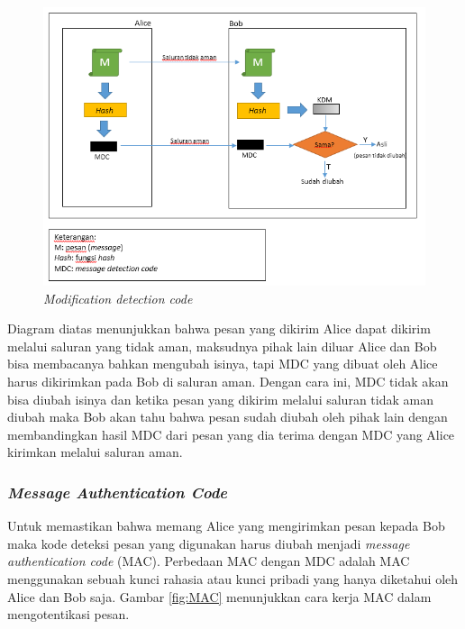 \begin{figure}[H]
	\includegraphics[scale=0.65]{Gambar/MDC}
	\centering
	\caption{\textit{Modification detection code}}\label{fig:MDC}
\end{figure}

Diagram diatas menunjukkan bahwa pesan yang dikirim Alice dapat dikirim melalui saluran yang tidak aman, maksudnya pihak lain diluar Alice dan Bob bisa membacanya bahkan mengubah isinya, tapi MDC yang dibuat oleh Alice harus dikirimkan pada Bob di saluran aman. Dengan cara ini, MDC tidak akan bisa diubah isinya dan ketika pesan yang dikirim melalui saluran tidak aman diubah maka Bob akan tahu bahwa pesan sudah diubah oleh pihak lain dengan membandingkan hasil MDC dari pesan yang dia terima dengan MDC yang Alice kirimkan melalui saluran aman.

\subsubsection{\textit{Message Authentication Code}}
Untuk memastikan bahwa memang Alice yang mengirimkan pesan kepada Bob maka kode deteksi pesan yang digunakan harus diubah menjadi \textit{message authentication code} (MAC). Perbedaan MAC dengan MDC adalah MAC menggunakan sebuah kunci rahasia atau kunci pribadi yang hanya diketahui oleh Alice dan Bob saja. Gambar \ref{fig:MAC} menunjukkan cara kerja MAC dalam mengotentikasi pesan.

